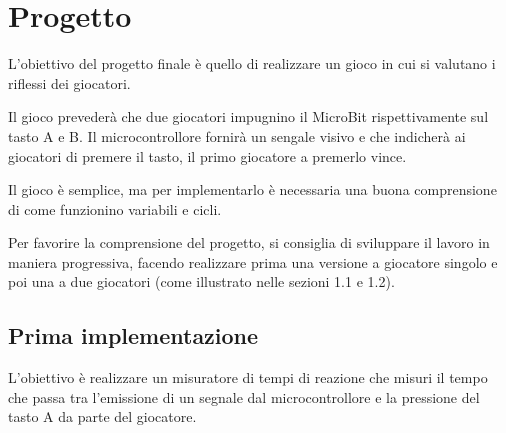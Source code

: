 \documentclass[../../docenti.tex]{subfiles}
\begin{document}
\section{Progetto}
L'obiettivo del progetto finale è quello di realizzare un gioco in cui si valutano i riflessi dei giocatori.

Il gioco prevederà che due giocatori impugnino il MicroBit rispettivamente sul tasto A e B.
Il microcontrollore fornirà un sengale visivo e che indicherà ai giocatori di premere il tasto, il primo giocatore a premerlo vince.

Il gioco è semplice, ma per implementarlo è necessaria una buona comprensione di come funzionino variabili e cicli.

Per favorire la comprensione del progetto, si consiglia di sviluppare il lavoro in maniera progressiva, facendo realizzare prima una versione a giocatore singolo e poi una a due giocatori (come illustrato nelle sezioni 1.1 e 1.2).

\subsection{Prima implementazione}

L'obiettivo è realizzare un misuratore di tempi di reazione che misuri il tempo che passa tra l'emissione di un segnale dal microcontrollore e la pressione del tasto A da parte del giocatore.
\end{document}
